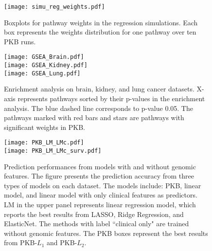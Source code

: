 \documentclass[a4paper,12pt]{article}
\begin{document}
\newpage
	
	
	
	\newpage
	\begin{figure}[htp]
		\centering
		\texttt{[image: simu\_reg\_weights.pdf]}
		\caption{Boxplots for pathway weights in the regression simulations. Each box represents the weights distribution for one pathway over ten PKB runs.}
		\label{fig:reg_weights}
	\end{figure}
\newpage
\begin{figure}[h]
	\centering
	\texttt{[image: GSEA\_Brain.pdf]}\\ \vspace{-3mm}
	\texttt{[image: GSEA\_Kidney.pdf]}\\ \vspace{-3mm}
	\texttt{[image: GSEA\_Lung.pdf]}
	\caption{Enrichment analysis on brain, kidney, and lung cancer datasets. X-axis represents pathways sorted by their p-values in the enrichment analysis. The blue dashed line corresponds to p-value 0.05. The pathways marked with red bars and stars are pathways with significant weights in PKB.}
	\label{fig:gsea}
\end{figure}
\newpage
\begin{figure}[htp]
	\centering
	\texttt{[image: PKB\_LM\_LMc.pdf]} \\ \vspace{-4mm}
	\texttt{[image: PKB\_LM\_LMc\_surv.pdf]}
	\caption{Prediction performances from models with and without genomic features. The figure presents the prediction accuracy from three types of models on each dataset. The models include: PKB, linear model, and linear model with only clinical features as predictors. LM in the upper panel represents linear regression model, which reports the best results from LASSO, Ridge Regression, and ElasticNet. The methods with label ``clinical only" are trained without genomic features. The PKB boxes represent the best results from PKB-$L_1$ and PKB-$L_2$.}
	\label{fig:clin_noclin}
\end{figure}
	\newpage
\end{document}
